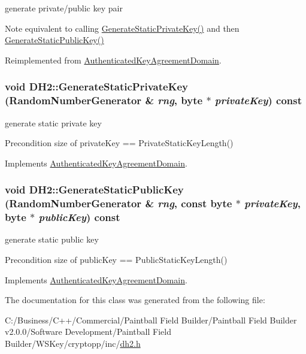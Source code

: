 generate private/public key pair \begin{DoxyNote}{Note}
equivalent to calling \hyperlink{class_d_h2_a05de579e63f552a103208bd7fdd23440}{GenerateStaticPrivateKey()} and then \hyperlink{class_d_h2_a7151a0d3e0ab520aef0b61c70f59a50a}{GenerateStaticPublicKey()} 
\end{DoxyNote}


Reimplemented from \hyperlink{class_authenticated_key_agreement_domain_a164d5f09c1af319f4bd4a4d45c4b9309}{AuthenticatedKeyAgreementDomain}.\hypertarget{class_d_h2_a05de579e63f552a103208bd7fdd23440}{
\subsubsection[{GenerateStaticPrivateKey}]{\setlength{\rightskip}{0pt plus 5cm}void DH2::GenerateStaticPrivateKey ({\bf RandomNumberGenerator} \& {\em rng}, \/  byte $\ast$ {\em privateKey}) const}}
\label{class_d_h2_a05de579e63f552a103208bd7fdd23440}


generate static private key \begin{DoxyPrecond}{Precondition}
size of privateKey == PrivateStaticKeyLength() 
\end{DoxyPrecond}


Implements \hyperlink{class_authenticated_key_agreement_domain_a00d9b12028e9ecb61af6d0f312965c6f}{AuthenticatedKeyAgreementDomain}.\hypertarget{class_d_h2_a7151a0d3e0ab520aef0b61c70f59a50a}{
\subsubsection[{GenerateStaticPublicKey}]{\setlength{\rightskip}{0pt plus 5cm}void DH2::GenerateStaticPublicKey ({\bf RandomNumberGenerator} \& {\em rng}, \/  const byte $\ast$ {\em privateKey}, \/  byte $\ast$ {\em publicKey}) const}}
\label{class_d_h2_a7151a0d3e0ab520aef0b61c70f59a50a}


generate static public key \begin{DoxyPrecond}{Precondition}
size of publicKey == PublicStaticKeyLength() 
\end{DoxyPrecond}


Implements \hyperlink{class_authenticated_key_agreement_domain_a853885a901ac7c4f8c51fd177df5d96c}{AuthenticatedKeyAgreementDomain}.

The documentation for this class was generated from the following file:\begin{DoxyCompactItemize}
\item 
C:/Business/C++/Commercial/Paintball Field Builder/Paintball Field Builder v2.0.0/Software Development/Paintball Field Builder/WSKey/cryptopp/inc/\hyperlink{dh2_8h}{dh2.h}\end{DoxyCompactItemize}
